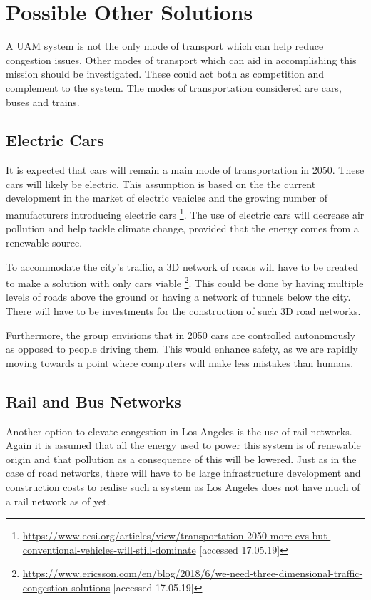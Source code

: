 \section{Possible Other Solutions}
\label{comparisonmodesoftransport}
A UAM system is not the only mode of transport which can help reduce congestion issues. Other modes of transport which can aid in accomplishing this mission should be investigated. These could act both as competition and complement to the system. The modes of transportation considered are cars, buses and trains.

\subsection{Electric Cars}
It is expected that cars will remain a main mode of transportation in 2050. These cars will likely be electric. This assumption is based on the the current development in the market of electric vehicles and the growing number of manufacturers introducing electric cars \footnote{\url{https://www.eesi.org/articles/view/transportation-2050-more-evs-but-conventional-vehicles-will-still-dominate} [accessed 17.05.19]}. The use of electric cars will decrease air pollution and help tackle climate change, provided that the energy comes from a renewable source.

To accommodate the city's traffic, a 3D network of roads will have to be created to make a solution with only cars viable \footnote{\url{https://www.ericsson.com/en/blog/2018/6/we-need-three-dimensional-traffic-congestion-solutions} [accessed 17.05.19]}. This could be done by having multiple levels of roads above the ground or having a network of tunnels below the city. There will have to be investments for the construction of such 3D road networks. 

Furthermore, the group envisions that in 2050 cars are controlled autonomously as opposed to people driving them. This would enhance safety, as we are rapidly moving towards a point where computers will make less mistakes than humans.

\subsection{Rail and Bus Networks}
Another option to elevate congestion in Los Angeles is the use of rail networks. Again it is assumed that all the energy used to power this system is of renewable origin and that pollution as a consequence of this will be lowered. Just as in the case of road networks, there will have to be large infrastructure development and construction costs to realise such a system as Los Angeles does not have much of a rail network as of yet. 

